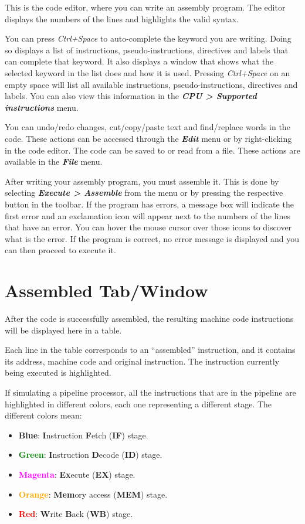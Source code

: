 \documentclass[11pt,a4paper,twoside,titlepage]{article}
\newcommand{\menupath}[1]{\textbf{\emph{#1}}}
\begin{document}
This is the code editor, where you can write an assembly program.
The editor displays the numbers of the lines and highlights the valid syntax.

You can press \emph{Ctrl+Space} to auto-complete the keyword you are writing.
Doing so displays a list of instructions, pseudo-instructions, directives and
labels that can complete that keyword.
It also displays a window that shows what the selected keyword in the list does
and how it is used.
Pressing \emph{Ctrl+Space} on an empty space will list all available
instructions, pseudo-instructions, directives and labels.
You can also view this information in the 
\menupath{CPU > Supported instructions} menu.

You can undo/redo changes, cut/copy/paste text and find/replace words in the
code. These actions can be accessed through the \menupath{Edit} menu or by
right-clicking in the code editor.
The code can be saved to or read from a file. These actions are available in
the \menupath{File} menu.

After writing your assembly program, you must assemble it.
This is done by selecting \menupath{Execute > Assemble} from the menu or by
pressing the respective button in the toolbar.
If the program has errors, a message box will indicate the first error and an
exclamation icon will appear next to the numbers of the lines that have an
error.
You can hover the mouse cursor over those icons to discover what is the error.
If the program is correct, no error message is displayed and you can then
proceed to execute it.


\section{Assembled Tab/Window}

After the code is successfully assembled, the resulting machine code 
instructions will be displayed here in a table.

Each line in the table corresponds to an ``assembled'' instruction, and it
contains its address, machine code and original instruction.
The instruction currently being executed is highlighted.

If simulating a pipeline processor, all the instructions that are in the
pipeline are highlighted in different colors, each one representing a
different stage.
The different colors mean:
\begin{itemize}
	\item \textbf{\textcolor{cyan2}{Blue}}: \textbf{I}nstruction 
		\textbf{F}etch (\textbf{IF}) stage.
	\item \textbf{\textcolor{green}{Green}}: \textbf{I}nstruction 
		\textbf{D}ecode (\textbf{ID}) stage.
	\item \textbf{\textcolor{magenta}{Magenta}}: \textbf{Ex}ecute 
		(\textbf{EX}) stage.
	\item \textbf{\textcolor{orange}{Orange}}: \textbf{Mem}ory access
		(\textbf{MEM}) stage.
	\item \textbf{\textcolor{red}{Red}}: \textbf{W}rite \textbf{B}ack 
		(\textbf{WB}) stage.
\end{itemize}
\end{document}
